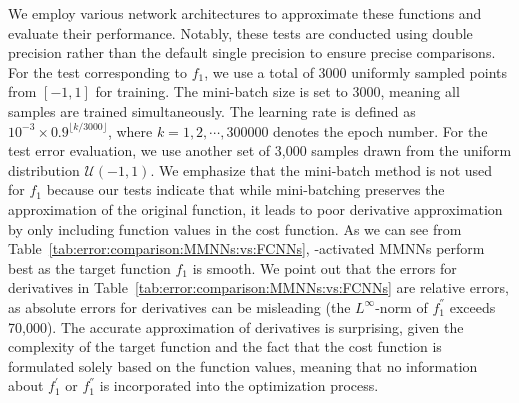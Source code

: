 \documentclass[11pt,a4paper]{article}
\let\dots\cdots
\begin{document}
We employ various network architectures to approximate these functions and evaluate their performance. Notably, these tests are conducted using double precision rather than the default single precision to ensure precise comparisons.
For the test corresponding to \( f_1 \), we use a total of 3000 uniformly sampled points from \( [-1,1] \) for training. The mini-batch size is set to 3000, meaning all samples are trained simultaneously. The learning rate is defined as \( 10^{-3} \times 0.9^{\lfloor k/3000 \rfloor} \), where \( k = 1,2,\dots,300000 \) denotes the epoch number. 
For the test error evaluation, we use another set of 3,000 samples drawn from the uniform distribution \( \mathcal{U}(-1,1) \).
We emphasize that the mini-batch method is not used for \( f_1 \) because our tests indicate that while mini-batching preserves the approximation of the original function, it leads to poor derivative approximation by only including function values in the cost function. As we can see from Table~\ref{tab:error:comparison:MMNNs:vs:FCNNs}, \sine-activated MMNNs perform best as the target function $f_1$ is smooth. We point out that the errors for derivatives in Table~\ref{tab:error:comparison:MMNNs:vs:FCNNs}  are relative errors, as absolute errors for derivatives can be misleading (the \( L^\infty \)-norm of \( f_1^\dprime \) exceeds 70,000). 
The accurate approximation of derivatives is surprising, given the complexity of the target function and the fact that the cost function is formulated solely based on the function values, meaning that no information about \( f_1^\prime\) or \( f_1^\dprime\) is incorporated into the optimization process.
\end{document}
